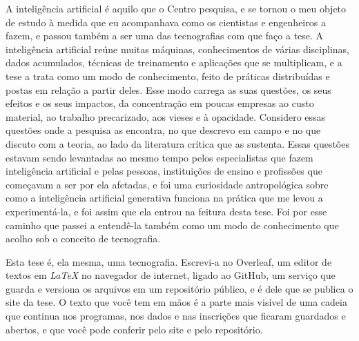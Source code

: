A inteligência artificial é aquilo que o Centro pesquisa, e se tornou o meu objeto de estudo à medida que eu acompanhava como os cientistas e engenheiros a fazem, e passou também a ser uma das tecnografias com que faço a tese. A inteligência artificial reúne muitas máquinas, conhecimentos de várias disciplinas, dados acumulados, técnicas de treinamento e aplicações que se multiplicam, e a tese a trata como um modo de conhecimento, feito de práticas distribuídas e postas em relação a partir deles. Esse modo carrega as suas questões, os seus efeitos e os seus impactos, da concentração em poucas empresas ao custo material, ao trabalho precarizado, aos vieses e à opacidade. Considero essas questões onde a pesquisa as encontra, no que descrevo em campo e no que discuto com a teoria, ao lado da literatura crítica que as sustenta. Essas questões estavam sendo levantadas ao mesmo tempo pelos especialistas que fazem inteligência artificial e pelas pessoas, instituições de ensino e profissões que começavam a ser por ela afetadas, e foi uma curiosidade antropológica sobre como a inteligência artificial generativa funciona na prática que me levou a experimentá-la, e foi assim que ela entrou na feitura desta tese. Foi por esse caminho que passei a entendê-la também como um modo de conhecimento que acolho sob o conceito de tecnografia.

Esta tese é, ela mesma, uma tecnografia. Escrevi-a no Overleaf, um editor de textos em \textit{LaTeX} no navegador de internet, ligado ao GitHub, um serviço que guarda e versiona os arquivos em um repositório público, e é dele que se publica o site da tese. O texto que você tem em mãos é a parte mais visível de uma cadeia que continua nos programas, nos dados e nas inscrições que ficaram guardados e abertos, e que você pode conferir pelo site e pelo repositório.

